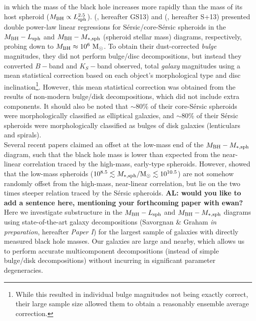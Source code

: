 \documentclass[preprint2]{emulateapj}
\begin{document}
in which the mass of the black hole increases more rapidly than the mass of its host spheroid ($M_{\rm BH} \propto L_{\rm sph}^{2.5}$). 
\citeauthor{grahamscott2013} (\citeyear{grahamscott2013}, hereafter GS13) and \citeauthor{scott2013} (\citeyear{scott2013}, hereafter S+13) 
presented double power-law linear regressions 
for S\'ersic/core-S\'ersic spheroids in the $M_{\rm BH} - L_{\rm sph}$ and $M_{\rm BH} - M_{\rm *,sph}$ 
(spheroid stellar mass) diagrams, respectively, probing down to $M_{\rm BH} \approx 10^6\rm~M_\odot$. 
To obtain their dust-corrected \emph{bulge} magnitudes, they did not perform bulge/disc decompositions, 
but instead they converted $B-$band and $K_S-$band observed, total \emph{galaxy} magnitudes 
using a mean statistical correction based on each object's morphological type and disc 
inclination\footnote{While this resulted in individual bulge magnitudes not being exactly correct, 
their large sample size allowed them to obtain a reasonably ensemble average correction.}. 
However, this mean statistical correction was obtained from the results of non-modern bulge/disk decompositions, 
which did not include extra components. 
It should also be noted that $\sim$80\% of their core-S\'ersic spheroids were morphologically classified as elliptical galaxies, 
and $\sim$80\% of their S\'ersic spheroids were morphologically classified as bulges of disk galaxies (lenticulars and spirals). \\
Several recent papers \citep{jiang2011a,jiang2013,mathur2012,reines2013} claimed an offset at the low-mass end of the $M_{\rm BH} - M_{\rm *,sph}$ diagram,
such that the black hole mass is lower than expected from the near-linear correlation traced by the high-mass, early-type spheroids. 
However, \cite{grahamscott2015} showed that the low-mass spheroids ($10^{8.5} \lesssim M_{\rm *,sph}/{\rm M_\odot} \lesssim 10^{10.5}$) 
are not somehow randomly offset from the high-mass, near-linear correlation, 
but lie on the two times steeper relation traced by the S\'ersic spheroids. 
{\bf AL: would you like to add a sentence here, mentioning your forthcoming paper with ewan?} \\
Here we investigate substructure in the $M_{\rm BH} - L_{\rm sph}$ and $M_{\rm BH} - M_{\rm *,sph}$ diagrams 
using state-of-the-art galaxy decompositions (Savorgnan \& Graham \emph{in preparation}, hereafter \emph{Paper I}) 
for the largest sample of galaxies with directly measured black hole masses.
Our galaxies are large and nearby, which allows us to perform accurate multicomponent decompositions 
(instead of simple bulge/disk decompositions) without incurring in significant parameter degeneracies. 
\end{document}

